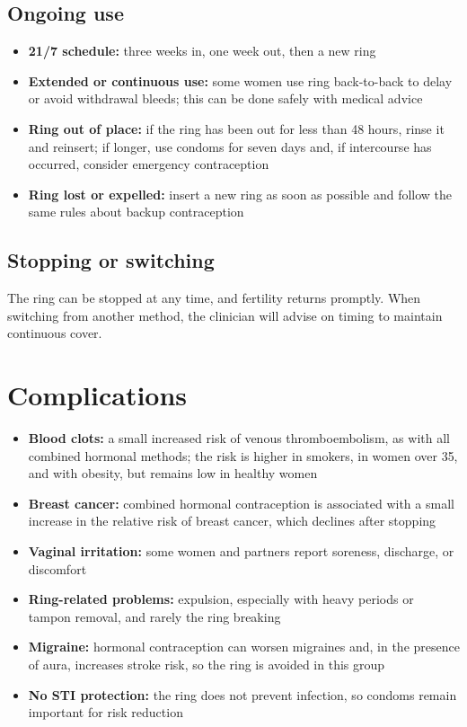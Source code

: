 \subsection*{Ongoing use}
\begin{itemize}
    \item \textbf{21/7 schedule:} three weeks in, one week out, then a new ring
    \item \textbf{Extended or continuous use:} some women use ring back-to-back to delay or avoid withdrawal bleeds; this can be done safely with medical advice
    \item \textbf{Ring out of place:} if the ring has been out for less than 48 hours, rinse it and reinsert; if longer, use condoms for seven days and, if intercourse has occurred, consider emergency contraception
    \item \textbf{Ring lost or expelled:} insert a new ring as soon as possible and follow the same rules about backup contraception
\end{itemize}

\subsection*{Stopping or switching}
The ring can be stopped at any time, and fertility returns promptly. When switching from another method, the clinician will advise on timing to maintain continuous cover.

\section*{Complications}
\begin{itemize}
    \item \textbf{Blood clots:} a small increased risk of venous thromboembolism, as with all combined hormonal methods; the risk is higher in smokers, in women over 35, and with obesity, but remains low in healthy women
    \item \textbf{Breast cancer:} combined hormonal contraception is associated with a small increase in the relative risk of breast cancer, which declines after stopping
    \item \textbf{Vaginal irritation:} some women and partners report soreness, discharge, or discomfort
    \item \textbf{Ring-related problems:} expulsion, especially with heavy periods or tampon removal, and rarely the ring breaking
    \item \textbf{Migraine:} hormonal contraception can worsen migraines and, in the presence of aura, increases stroke risk, so the ring is avoided in this group
    \item \textbf{No STI protection:} the ring does not prevent infection, so condoms remain important for risk reduction
\end{itemize}


